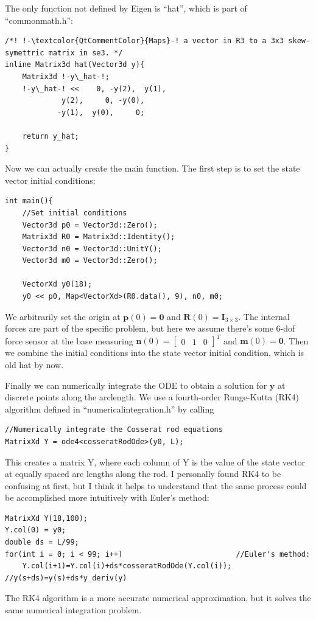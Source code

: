 \documentclass[12pt]{article}
\begin{document}
The only function not defined by Eigen is ``hat'', which is part of ``commonmath.h'':
\begin{lstlisting}
/*! !-\textcolor{QtCommentColor}{Maps}-! a vector in R3 to a 3x3 skew-symettric matrix in se3. */
inline Matrix3d hat(Vector3d y){
    Matrix3d !-y\_hat-!;
    !-y\_hat-! <<    0, -y(2),  y(1),
             y(2),     0, -y(0),
            -y(1),  y(0),     0;

    return y_hat;
}
\end{lstlisting}

Now we can actually create the main function. The first step is to set the state vector initial conditions:
\begin{lstlisting}
int main(){
    //Set initial conditions
    Vector3d p0 = Vector3d::Zero();
    Matrix3d R0 = Matrix3d::Identity();
    Vector3d n0 = Vector3d::UnitY();
    Vector3d m0 = Vector3d::Zero();

    VectorXd y0(18);
    y0 << p0, Map<VectorXd>(R0.data(), 9), n0, m0;
\end{lstlisting}
We arbitrarily set the origin at $\boldsymbol{p}(0) = \boldsymbol{0}$ and $\boldsymbol{R}(0) = \boldsymbol{I}_{3\times 3}$. The internal forces are part of the specific problem, but here we assume there's some 6-dof force sensor at the base measuring $\boldsymbol{n}(0) = \begin{bmatrix} 0 & 1 & 0 \end{bmatrix}^T$ and $\boldsymbol{m}(0) = \boldsymbol{0}$. Then we combine the initial conditions into the state vector initial condition, which is old hat by now.

Finally we can numerically integrate the ODE to obtain a solution for $\boldsymbol{y}$ at discrete points along the arclength. We use a fourth-order Runge-Kutta (RK4) algorithm defined in ``numericalintegration.h'' by calling
\begin{lstlisting}
//Numerically integrate the Cosserat rod equations
MatrixXd Y = ode4<cosseratRodOde>(y0, L);
\end{lstlisting}
This creates a matrix Y, where each column of Y is the value of the state vector at equally spaced arc lengths along the rod. I personally found RK4 to be confusing at first, but I think it helps to understand that the same process could be accomplished more intuitively with Euler's method:
\begin{lstlisting}
MatrixXd Y(18,100);
Y.col(0) = y0;
double ds = L/99;
for(int i = 0; i < 99; i++)                          //Euler's method:
    Y.col(i+1)=Y.col(i)+ds*cosseratRodOde(Y.col(i)); //y(s+ds)=y(s)+ds*y_deriv(y)
\end{lstlisting}
The RK4 algorithm is a more accurate numerical approximation, but it solves the same numerical integration problem.
\end{document}
